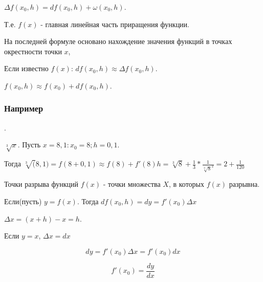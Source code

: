 $\Delta f(x_0,h) = df(x_0,h) + \omega(x_0, h)$.

Т.е. $f(x)$ - главная линейная часть приращения функции.

На последней формуле основано нахождение значения функций в точках окрестности точки $x$,

Если известно $f(x)$: $df(x_0, h)\approx \Delta f(x_0, h)$.

$f(x_0, h) \approx f(x_0) + df(x_0, h)$.

\subsubsection{Например}.

$\sqrt[3] x $. Пусть $x=8,1 : x_0 = 8; h = 0,1$. 

Тогда $\sqrt[3] (8,1) = f(8 + 0,1) \approx f(8) +f'(8)h = \sqrt[3] 8 + \frac {1}{3} * \frac {1}{\sqrt[3] 8^2}= 2 + \frac {1}{120}$

Точки разрыва функций $f(x)$ - точки множества $X$, в которых $f(x)$ разрывна.

Если(пусть) $y=f(x)$. Тогда $df(x_0, h) = dy = f'(x_0)\Delta x$ 

$\Delta x = (x+h)-x = h$.

Если $y=x$, $\Delta x = dx$

$$dy = f'(x_0)\Delta x = f'(x_0)dx$$

$$f'(x_0) = \frac {dy}{dx}$$